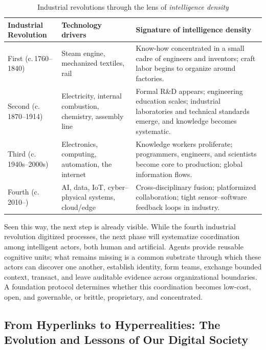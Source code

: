 \documentclass{llmxive}
\begin{document}
\begin{table}[ht]
\centering
\footnotesize
\begin{tabular}{@{}p{} p{} p{}@{}}
\toprule
\textbf{Industrial Revolution} & \textbf{Technology drivers} & \textbf{Signature of intelligence density}\\
\midrule
First (c.\,1760--1840) & Steam engine, mechanized textiles, rail & Know-how concentrated in a small cadre of engineers and inventors; craft labor begins to organize around factories. \\
Second (c.\,1870--1914) & Electricity, internal combustion, chemistry, assembly line & Formal R\&D appears; engineering education scales; industrial laboratories and technical standards emerge, and knowledge becomes systematic.\\
Third (c.\,1940s--2000s) & Electronics, computing, automation, the internet & Knowledge workers proliferate; programmers, engineers, and scientists become core to production; global information flows. \\
Fourth (c.\,2010--) & AI, data, IoT, cyber--physical systems, cloud/edge & Cross-disciplinary fusion; platformized collaboration; tight sensor--software feedback loops in industry. \\
\bottomrule
\end{tabular}
\caption{Industrial revolutions through the lens of \emph{intelligence density}}
\label{tab:intel-density}
\end{table}

Seen this way, the next step is already visible. While the fourth industrial revolution digitized processes, the next phase will systematize coordination among intelligent actors, both human and artificial. Agents provide reusable cognitive units; what remains missing is a common substrate through which these actors can discover one another, establish identity, form teams, exchange bounded context, transact, and leave auditable evidence across organizational boundaries. A foundation protocol determines whether this coordination becomes low-cost, open, and governable, or brittle, proprietary, and concentrated.



\subsection{From Hyperlinks to Hyperrealities: The Evolution and Lessons of Our Digital Society}
\label{subsec:web-evolve}
\end{document}
